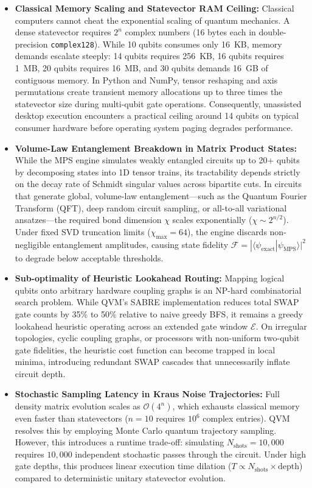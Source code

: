 \begin{itemize}[leftmargin=*]
    \item \textbf{Classical Memory Scaling and Statevector RAM Ceiling:} Classical computers cannot cheat the exponential scaling of quantum mechanics. A dense statevector requires $2^n$ complex numbers (16 bytes each in double-precision \texttt{complex128}). While 10 qubits consumes only 16~KB, memory demands escalate steeply: 14 qubits requires 256~KB, 16 qubits requires 1~MB, 20 qubits requires 16~MB, and 30 qubits demands 16~GB of contiguous memory. In Python and NumPy, tensor reshaping and axis permutations create transient memory allocations up to three times the statevector size during multi-qubit gate operations. Consequently, unassisted desktop execution encounters a practical ceiling around 14 qubits on typical consumer hardware before operating system paging degrades performance.
    \item \textbf{Volume-Law Entanglement Breakdown in Matrix Product States:} While the MPS engine simulates weakly entangled circuits up to 20+ qubits by decomposing states into 1D tensor trains, its tractability depends strictly on the decay rate of Schmidt singular values across bipartite cuts. In circuits that generate global, volume-law entanglement---such as the Quantum Fourier Transform (QFT), deep random circuit sampling, or all-to-all variational ansatzes---the required bond dimension $\chi$ scales exponentially ($\chi \sim 2^{n/2}$). Under fixed SVD truncation limits ($\chi_{\text{max}} = 64$), the engine discards non-negligible entanglement amplitudes, causing state fidelity $\mathcal{F} = |\langle \psi_{\text{exact}} | \psi_{\text{MPS}} \rangle|^2$ to degrade below acceptable thresholds.
    \item \textbf{Sub-optimality of Heuristic Lookahead Routing:} Mapping logical qubits onto arbitrary hardware coupling graphs is an NP-hard combinatorial search problem. While QVM's SABRE implementation reduces total SWAP gate counts by 35\% to 50\% relative to naive greedy BFS, it remains a greedy lookahead heuristic operating across an extended gate window $\mathcal{E}$. On irregular topologies, cyclic coupling graphs, or processors with non-uniform two-qubit gate fidelities, the heuristic cost function can become trapped in local minima, introducing redundant SWAP cascades that unnecessarily inflate circuit depth.
    \item \textbf{Stochastic Sampling Latency in Kraus Noise Trajectories:} Full density matrix evolution scales as $\mathcal{O}(4^n)$, which exhausts classical memory even faster than statevectors ($n=10$ requires $10^6$ complex entries). QVM resolves this by employing Monte Carlo quantum trajectory sampling. However, this introduces a runtime trade-off: simulating $N_{\text{shots}} = 10{,}000$ requires $10{,}000$ independent stochastic passes through the circuit. Under high gate depths, this produces linear execution time dilation ($T \propto N_{\text{shots}} \times \text{depth}$) compared to deterministic unitary statevector evolution.
\end{itemize}

